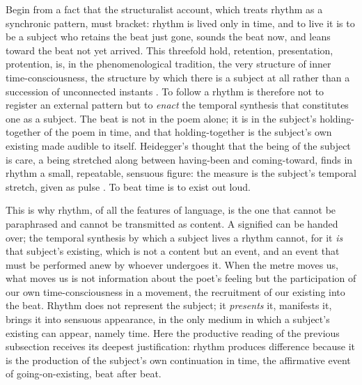 Begin from a fact that the structuralist account, which treats rhythm as a synchronic pattern, must bracket: rhythm is lived only in time, and to live it is to be a subject who retains the beat just gone, sounds the beat now, and leans toward the beat not yet arrived. This threefold hold, retention, presentation, protention, is, in the phenomenological tradition, the very structure of inner time-consciousness, the structure by which there is a subject at all rather than a succession of unconnected instants \parencite{husserl1991time}. To follow a rhythm is therefore not to register an external pattern but to \emph{enact} the temporal synthesis that constitutes one as a subject. The beat is not in the poem alone; it is in the subject's holding-together of the poem in time, and that holding-together is the subject's own existing made audible to itself. Heidegger's thought that the being of the subject is care, a being stretched along between having-been and coming-toward, finds in rhythm a small, repeatable, sensuous figure: the measure is the subject's temporal stretch, given as pulse \parencite{heidegger1962being}. To beat time is to exist out loud.

This is why rhythm, of all the features of language, is the one that cannot be paraphrased and cannot be transmitted as content. A signified can be handed over; the temporal synthesis by which a subject lives a rhythm cannot, for it \emph{is} that subject's existing, which is not a content but an event, and an event that must be performed anew by whoever undergoes it. When the metre moves us, what moves us is not information about the poet's feeling but the participation of our own time-consciousness in a movement, the recruitment of our existing into the beat. Rhythm does not represent the subject; it \emph{presents} it, manifests it, brings it into sensuous appearance, in the only medium in which a subject's existing can appear, namely time. Here the productive reading of the previous subsection receives its deepest justification: rhythm produces difference because it is the production of the subject's own continuation in time, the affirmative event of going-on-existing, beat after beat.

